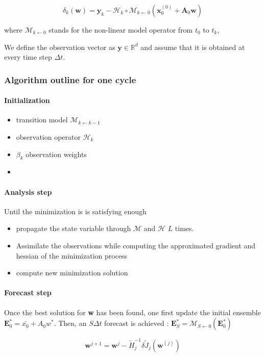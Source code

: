 \documentclass[a4,12pt]{article}
\begin{document}
$$\delta_{k}(\textbf{w}) = \textbf{y}_{k} - \mathcal{H}_{k}\circ \mathcal{M}_{k\leftarrow 0}(\textbf{x}_{0}^{(0)} + \textbf{A}_{0}\textbf{w})$$

where $\mathcal{M}_{k\leftarrow 0}$ stands for the non-linear model operator from $t_{0}$ to $t_{k}$,%

We define the observation vector as $\textbf{y} \in \mathbb{R}^d$ and assume that it is obtained at every time step $\Delta t$. \\
\subsubsection{Algorithm outline for one cycle}
\paragraph{Initialization}
\begin{itemize}
\item transition model $\mathcal{M}_{k\leftarrow k-1}$
\item observation operator $\mathcal{H}_{k}$
\item $\beta_{k}$ observation weights
\item 
\end{itemize}
\paragraph{Analysis step}
Until the minimization is is satisfying enough
\begin{itemize}
\item propagate the state variable through $\mathcal{M}$ and $\mathcal{H}$ $L$ times.
\item Assimilate the observations while computing the approximated gradient and hessian of the minimization process
\item compute new minimization solution
\end{itemize}
\paragraph{Forecast step}
Once the best solution for \textbf{w} has been found, one first update the initial ensemble $\textbf{E}^{*}_0 = \bar{x_0} + A_{0}w^{*}$. Then, an $S\Delta t$ forecast is achieved : $\textbf{E}^{*}_S = \mathcal{M}_{S\leftarrow 0}(\textbf{E}^{*}_0)$

$$\textbf{w}^{j+1} = \textbf{w}^{j} - \tilde{H}_{j}^{-1} \delta \tilde{J}_{j}(\textbf{w}^{(j)})$$
\end{document}
